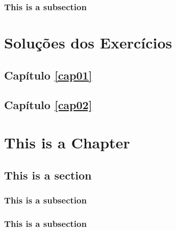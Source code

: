 \documentclass[palette=nighthill]{formatacao/classe-apostila}
\begin{document}
\subsection{This is a subsection}
\lipsum[1-2]

\bibliografia

\begin{appendices}
\chapter{Soluções dos Exercícios}

\section*{Capítulo \ref{cap01}}
\printsolutions[chapter={1}]

\section*{Capítulo \ref{cap02}}
\printsolutions[chapter={2}]

\chapter{This is a Chapter}
\section{This is a section}
\subsection{This is a subsection}
\lipsum[1-3]

\subsection{This is a subsection}
\lipsum[1-2]


\end{appendices}
\end{document}
